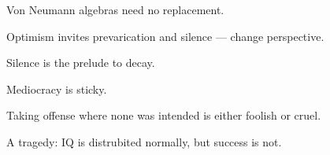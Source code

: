 \documentclass[a]{subfiles}
\begin{document}
\begin{parsec}%
Von Neumann algebras
need no replacement.
\end{parsec}
\begin{parsec}%
Optimism
invites prevarication and silence
--- change perspective.
\end{parsec}
\begin{parsec}%
Silence is the prelude to decay.
\end{parsec}
\begin{parsec}%
Mediocracy is sticky.
\end{parsec}
\begin{parsec}%
Taking offense where none was intended
is either foolish or cruel.
\end{parsec}
\begin{parsec}%
A tragedy:
IQ is distrubited normally,
but success is not.
\end{parsec}
\end{document}
